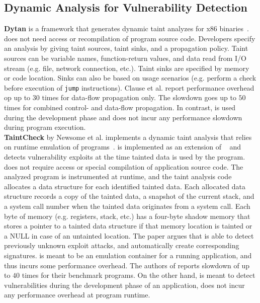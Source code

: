 \subsection{Dynamic Analysis for Vulnerability Detection}
\textbf{Dytan} is a framework that generates dynamic
taint analyzes for x$86$ binaries~\cite{Clause:2007:Dytan}.
\dytan does not need access or recompilation of program source code.
Developers specify an analysis by giving taint sources, taint sinks,
and a propagation policy. Taint sources can be variable names,
function-return values, and data read from I/O stream (e.g. file, 
network connection, etc.). Taint sinks are specified by memory or code
location. Sinks can also be based on usage scenarios (e.g. 
perform a check before execution of \texttt{jump} instructions).
Clause et al. report performance overhead op up to $30$ times
for data-flow propagation only. The slowdown goes up to $50$
times for combined control- and data-flow propagation.
In contrast, \waint is used during the development phase and
does not incur any performance slowdown during program execution.\\

\textbf{TaintCheck} by Newsome et al. implements a dynamic
taint analysis that relies on runtime emulation of
programs~\cite{Newsome:2005:taintcheck}. \taintcheck is
implemented as an extension of \valgrind~\cite{Nethercote:2003:valgrind}
and detects vulnerability exploits at the time tainted data is used
by the program. \taintcheck does not require access or special
compilation of application source code. The analyzed program is
instrumented at runtime, and the taint analysis code allocates
a data structure for each identified tainted data.
Each allocated data structure records a copy of the tainted data,
a snapshot of the current stack, and a system call number when
the tainted data originates from a system call. Each byte of memory
(e.g. registers, stack, etc.) has a four-byte shadow memory
that stores a pointer to a tainted data structure if that memory
location is tainted or a NULL in case of an untainted location.
The paper argues that \taintcheck is able to detect previously
unknown exploit attacks, and automatically create corresponding
signatures.
\taintcheck is meant to be an emulation container for a running
application, and thus incurs some performance overhead. The authors
of \taintcheck reports slowdown of up to $40$ times for their
benchmark programs.
On the other hand, \waint is meant to detect vulnerabilities
during the development phase of an application, does not incur
any performance overhead at program runtime.\\

